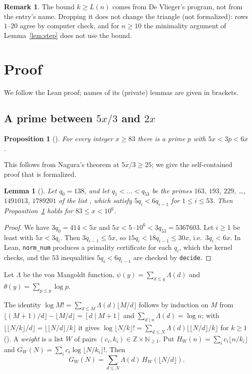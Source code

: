 \documentclass[11pt]{amsart}
\theoremstyle{plain}
\newtheorem{lemma}[theorem]{Lemma}
\newtheorem{proposition}[theorem]{Proposition}
\theoremstyle{definition}
\newtheorem{remark}[theorem]{Remark}
\newcommand{\N}{\mathbb{N}}
\newcommand{\fl}[1]{\lfloor #1\rfloor}
\begin{document}
\begin{remark}\label{rem:bound}
The bound $k\ge L(n)$ comes from De Vlieger's program, not from the entry's name. Dropping it does not change the triangle (not formalized): rows $1$--$20$ agree by computer check, and for $n\ge10$ the minimality argument of Lemma~\ref{lem:step} does not use the bound.
\end{remark}

\section{Proof}\label{sec:proof}

We follow the Lean proof; names of its (private) lemmas are given in brackets.

\subsection{\texorpdfstring{A prime between $5x/3$ and $2x$}{A prime between 5x/3 and 2x}}

\begin{proposition}[]\label{prop:nagura}
For every integer $x\ge83$ there is a prime $p$ with $5x<3p<6x$.
\end{proposition}

This follows from Nagura's theorem \cite{Nag} at $5x/3\ge25$; we give the self-contained proof that is formalized.

\begin{lemma}[]\label{lem:ladder}
Let $q_0=138$, and let $q_1<\dots<q_{53}$ be the primes $163$, $193$, $229$, \dots, $1491013$, $1789201$ of the list , which satisfy $5q_{i}<6q_{i-1}$ for $1\le i\le53$. Then Proposition~\ref{prop:nagura} holds for $83\le x<10^6$.
\end{lemma}

\begin{proof}
We have $3q_0=414<5x$ and $5x<5\cdot10^6<3q_{53}=5367603$. Let $i\ge1$ be least with $5x<3q_i$. Then $3q_{i-1}\le5x$, so $15q_i<18q_{i-1}\le30x$, i.e.\ $3q_i<6x$. In Lean, \texttt{norm\_num} produces a primality certificate for each $q_i$, which the kernel checks, and the $53$ inequalities $5q_i<6q_{i-1}$ are checked by \texttt{decide}.
\end{proof}

Let $\Lambda$ be the von Mangoldt function, $\psi(y)=\sum_{d\le y}\Lambda(d)$ and $\theta(y)=\sum_{p\le y}\log p$.

The identity $\log M!=\sum_{d\le M}\Lambda(d)\fl{M/d}$ follows by induction on $M$ from $\fl{(M+1)/d}-\fl{M/d}=[d\mid M+1]$ and $\sum_{d\mid n}\Lambda(d)=\log n$; with $\fl{\fl{N/k}/d}=\fl{\fl{N/d}/k}$ it gives $\log\fl{N/k}!=\sum_{d\le N}\Lambda(d)\fl{\fl{N/d}/k}$ for $k\ge1$ (). A \emph{weight} is a list $W$ of pairs $(c_i,k_i)\in\mathbb{Z}\times\N_{\ge1}$. Put $H_W(n)=\sum_i c_i\fl{n/k_i}$ and $G_W(N)=\sum_i c_i\log\fl{N/k_i}!$. Then
\begin{equation}\label{eq:G}
G_W(N)=\sum_{d\le N}\Lambda(d)\,H_W(\fl{N/d}).
\end{equation}
\end{document}
